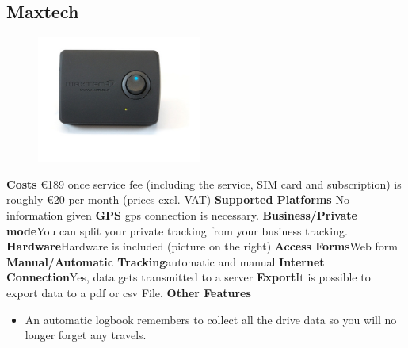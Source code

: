 \begin{singlespace}
\section{Maxtech}
\begin{figure}
  \begin{center}
    \includegraphics[width=0.48\textwidth]{bilder/logbook}
  \end{center}
\end{figure}
\textbf{Costs} \euro 189 once
service fee (including the service, SIM card and subscription) is roughly \euro 20 per month (prices excl. VAT)
\newline\newline
\textbf{Supported Platforms} No information given
\newline\newline
\textbf{GPS} \gls{gps} connection is necessary.
\newline\newline
\textbf{Business/Private mode}You can split your private tracking from your business tracking.
\newline\newline
\textbf{Hardware}Hardware is included (picture on the right)
\newline\newline
\textbf{Access Forms}Web form
\newline\newline
\textbf{Manual/Automatic Tracking}automatic and manual
\newline\newline
\textbf{Internet Connection}Yes, data gets transmitted to a server
\newline\newline
\textbf{Export}It is  possible to export data to a \gls{pdf} or \gls{csv} File.
\newline\newline
\textbf{Other Features}
\begin{itemize}
\item An automatic logbook remembers to collect all the drive data so you will no longer forget any travels.

\end{itemize}
\end{singlespace}

